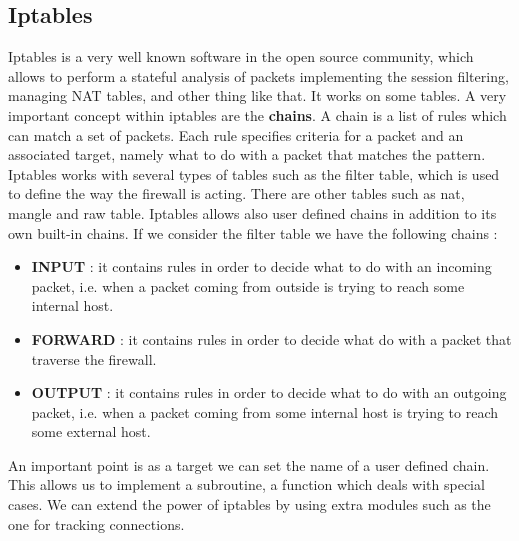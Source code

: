 \documentclass[11pt]{article}
\begin{document}
\subsection{Iptables}
Iptables is a very well known software in the open source community, which allows to perform a stateful analysis of packets implementing the session filtering, managing NAT tables, and other thing like that. It works on some tables. A very important concept within iptables are the \textbf{chains}. A chain is a list of rules which can match a set of packets. Each rule specifies criteria for a packet and an associated target, namely what to do with a packet that matches the pattern. Iptables works with several types of tables such as the filter table, which is used to define the way the firewall is acting. There are other tables such as nat, mangle and raw table. Iptables allows also user defined chains in addition to its own built-in chains. If we consider the filter table we have the following chains :
\begin{itemize}
\item \textbf{INPUT} : it contains rules in order to decide what to do with an incoming packet, i.e. when a packet coming from outside is trying to reach some internal host.
\item \textbf{FORWARD} : it contains rules in order to decide what do with a packet that traverse the firewall.
\item \textbf{OUTPUT} : it contains rules in order to decide what to do with an outgoing packet, i.e. when a packet coming from some internal host is trying to reach some external host.
\end{itemize}
An important point is as a target we can set the name of a user defined chain. This allows us to implement a subroutine, a function which deals with special cases. We can extend the power of iptables by using extra modules such as the one for tracking connections.
\end{document}
